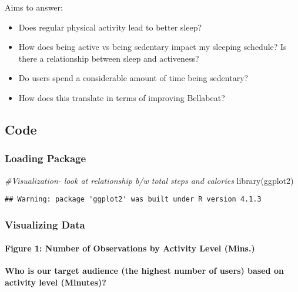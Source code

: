 \documentclass[
]{article}
\newenvironment{Shaded}{\begin{snugshade}}{\end{snugshade}}
\newcommand{\CommentTok}[1]{\textcolor[rgb]{0.56,0.35,0.01}{\textit{#1}}}
\newcommand{\FunctionTok}[1]{\textcolor[rgb]{0.00,0.00,0.00}{#1}}
\newcommand{\NormalTok}[1]{#1}
\providecommand{\tightlist}{%
  \setlength{\itemsep}{0pt}\setlength{\parskip}{0pt}}
\begin{document}
Aims to answer:

\begin{itemize}
\tightlist
\item
  Does regular physical activity lead to better sleep?
\item
  How does being active vs being sedentary impact my sleeping schedule?
  Is there a relationship between sleep and activeness?
\item
  Do users spend a considerable amount of time being sedentary?
\item
  How does this translate in terms of improving Bellabeat?
\end{itemize}

\hypertarget{code-2}{%
\subsection{Code}\label{code-2}}

\hypertarget{loading-package}{%
\subsubsection{Loading Package}\label{loading-package}}

\begin{Shaded}
\begin{Highlighting}[]
\CommentTok{\#Visualization{-} look at relationship b/w total steps and calories}
\FunctionTok{library}\NormalTok{(ggplot2)}
\end{Highlighting}
\end{Shaded}

\begin{verbatim}
## Warning: package 'ggplot2' was built under R version 4.1.3
\end{verbatim}

\hypertarget{visualizing-data}{%
\subsubsection{Visualizing Data}\label{visualizing-data}}

\hypertarget{figure-1-number-of-observations-by-activity-level-mins.}{%
\paragraph{Figure 1: Number of Observations by Activity Level
(Mins.)}\label{figure-1-number-of-observations-by-activity-level-mins.}}

\textbf{Who is our target audience (the highest number of users) based
on activity level (Minutes)?}
\end{document}
